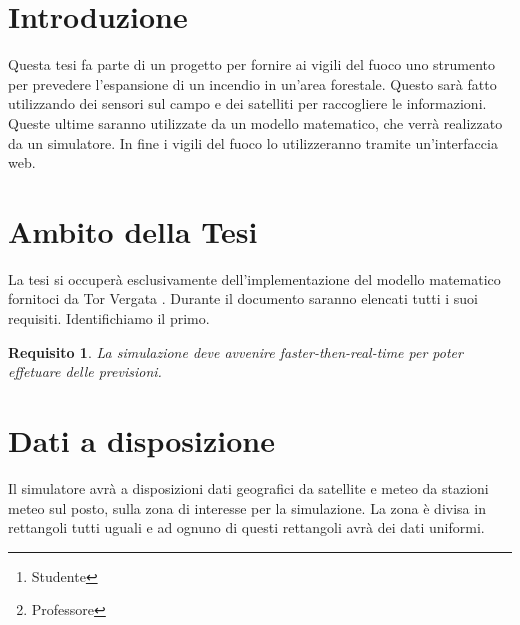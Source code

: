 \documentclass[draft]{article}
\title{\mytitle}
\date{2021}
\author{Diego Bellani\thanks{Studente}\and Enrico Tronci\thanks{Professore}}
\newcommand{\eng}[1]{\foreignlanguage{english}{#1}} %
\let\oldmarginpar\marginpar
\renewcommand{\marginpar}[1]{\oldmarginpar{\raggedright #1}}
\newtheorem{requirement}{Requisito}
\begin{document}
\begin{titlepage}
	\maketitle

	\begin{abstract}
	Questo documento \marginpar{Da espandere.} contiene le specifiche dei
	requisiti per la tesi sulla simulazione \eng{multi-core} di incendi.
	\end{abstract}

	\tableofcontents
	\listoffigures
	\listoftables
\end{titlepage}


\section{Introduzione}

Questa tesi fa parte di un progetto per fornire ai vigili del fuoco uno
strumento per prevedere l'espansione di un incendio in un'area forestale. Questo
sarà fatto utilizzando dei sensori sul campo e dei satelliti per raccogliere le
informazioni. Queste ultime saranno utilizzate da un modello matematico, che
verrà realizzato da un simulatore. In fine i vigili del fuoco lo utilizzeranno
tramite un'interfaccia web.

\section{Ambito della Tesi}

La tesi si occuperà esclusivamente dell'implementazione del modello matematico
fornitoci da Tor Vergata \cite{mod}. Durante il documento saranno elencati tutti
i suoi requisiti. Identifichiamo il primo.


\begin{requirement}\label{thm:faster}
La simulazione deve avvenire \eng{faster-then-real-time} per poter effetuare
delle previsioni.
\end{requirement}

\section{Dati a disposizione}

Il simulatore avrà a disposizioni dati geografici da satellite \cite{cop} e
meteo da stazioni meteo sul posto, sulla zona di interesse per la simulazione.
La zona è divisa in rettangoli tutti uguali e ad ognuno di questi rettangoli
avrà dei dati uniformi.
\end{document}
